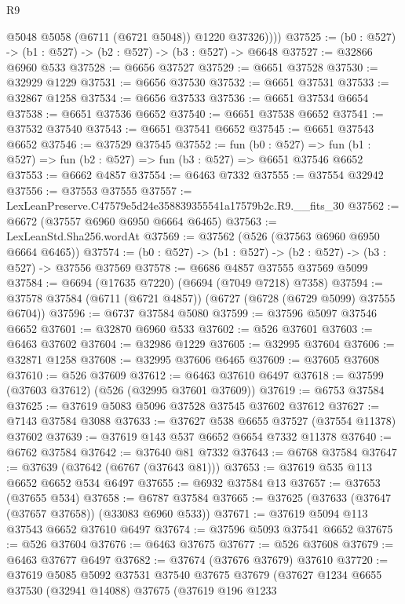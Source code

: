 \begin{lexlean}{R9}
\begin{coremodule}
            @5048
            @5058
            (@6711 (@6721 @5048))
            @1220
            @37326))))
@37525 := (b0 : @527) -> (b1 : @527) -> (b2 : @527) -> (b3 : @527) -> @6648
@37527 := @32866 @6960 @533
@37528 := @6656 @37527
@37529 := @6651 @37528
@37530 := @32929 @1229
@37531 := @6656 @37530
@37532 := @6651 @37531
@37533 := @32867 @1258
@37534 := @6656 @37533
@37536 := @6651 @37534 @6654
@37538 := @6651 @37536 @6652
@37540 := @6651 @37538 @6652
@37541 := @37532 @37540
@37543 := @6651 @37541 @6652
@37545 := @6651 @37543 @6652
@37546 := @37529 @37545
@37552 := fun (b0 : @527) =>
  fun (b1 : @527) => fun (b2 : @527) => fun (b3 : @527) => @6651 @37546 @6652
@37553 := @6662 @4857
@37554 := @6463 @7332
@37555 := @37554 @32942
@37556 := @37553 @37555
@37557 := LexLeanPreserve.C47579e5d24e358839355541a17579b2c.R9.__fits_30
@37562 := @6672 (@37557 @6960 @6950 @6664 @6465)
@37563 := LexLeanStd.Sha256.wordAt
@37569 := @37562 (@526 (@37563 @6960 @6950 @6664 @6465))
@37574 := (b0 : @527) -> (b1 : @527) -> (b2 : @527) -> (b3 : @527) -> @37556 @37569
@37578 := @6686 @4857 @37555 @37569 @5099
@37584 := @6694 (@17635 @7220) (@6694 (@7049 @7218) @7358)
@37594 := @37578 @37584 (@6711 (@6721 @4857)) (@6727 (@6728 (@6729 @5099) @37555 @6704))
@37596 := @6737 @37584 @5080
@37599 := @37596 @5097 @37546 @6652
@37601 := @32870 @6960 @533
@37602 := @526 @37601
@37603 := @6463 @37602
@37604 := @32986 @1229
@37605 := @32995 @37604
@37606 := @32871 @1258
@37608 := @32995 @37606 @6465
@37609 := @37605 @37608
@37610 := @526 @37609
@37612 := @6463 @37610 @6497
@37618 := @37599 (@37603 @37612) (@526 (@32995 @37601 @37609))
@37619 := @6753 @37584
@37625 := @37619 @5083 @5096 @37528 @37545 @37602 @37612
@37627 := @7143 @37584 @3088
@37633 := @37627 @538 @6655 @37527 (@37554 @11378) @37602
@37639 := @37619 @143 @537 @6652 @6654 @7332 @11378
@37640 := @6762 @37584
@37642 := @37640 @81 @7332
@37643 := @6768 @37584
@37647 := @37639 (@37642 (@6767 (@37643 @81)))
@37653 := @37619 @535 @113 @6652 @6652 @534 @6497
@37655 := @6932 @37584 @13
@37657 := @37653 (@37655 @534)
@37658 := @6787 @37584
@37665 := @37625 (@37633 (@37647 (@37657 @37658)) (@33083 @6960 @533))
@37671 := @37619 @5094 @113 @37543 @6652 @37610 @6497
@37674 := @37596 @5093 @37541 @6652
@37675 := @526 @37604
@37676 := @6463 @37675
@37677 := @526 @37608
@37679 := @6463 @37677 @6497
@37682 := @37674 (@37676 @37679) @37610
@37720 := @37619
    @5085
    @5092
    @37531
    @37540
    @37675
    @37679
    (@37627
      @1234
      @6655
      @37530
      (@32941 @14088)
      @37675
      (@37619
        @196
        @1233

\end{coremodule}
\end{lexlean}
